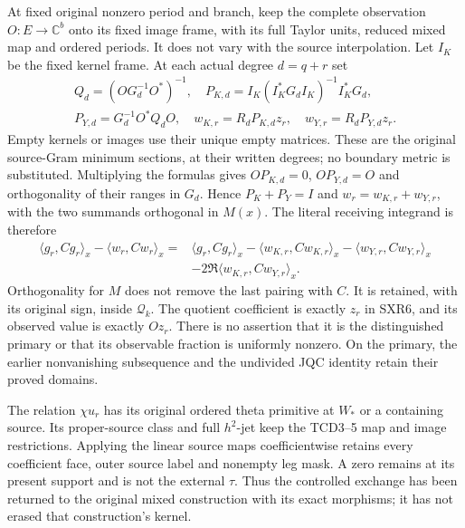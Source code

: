 At fixed original nonzero period and branch, keep the complete
observation $O:E\to\mathbb C^b$ onto its fixed image frame, with
its full Taylor units, reduced mixed map and ordered periods. It
does not vary with the source interpolation. Let $I_K$ be the fixed
kernel frame. At each actual degree $d=q+r$ set
\begin{equation}\tag{SXR19}
\begin{gathered}
 Q_d=(OG_d^{-1}O^*)^{-1},\quad
 P_{K,d}=I_K(I_K^*G_dI_K)^{-1}I_K^*G_d,\\
 P_{Y,d}=G_d^{-1}O^*Q_dO,\quad
 w_{K,r}=R_dP_{K,d}z_r,\quad w_{Y,r}=R_dP_{Y,d}z_r.
\end{gathered}
\end{equation}
Empty kernels or images use their unique empty matrices. These
are the original source-Gram minimum sections, at their written
degrees; no boundary metric is substituted. Multiplying the
formulas gives $OP_{K,d}=0$, $OP_{Y,d}=O$ and orthogonality of
their ranges in $G_d$. Hence $P_K+P_Y=I$ and
$w_r=w_{K,r}+w_{Y,r}$, with the two summands orthogonal in $M(x)$.
The literal receiving integrand is therefore
\begin{equation}\tag{SXR20}
\begin{aligned}
 \langle g_r,Cg_r\rangle_x-\langle w_r,Cw_r\rangle_x
 ={}&\langle g_r,Cg_r\rangle_x
   -\langle w_{K,r},Cw_{K,r}\rangle_x
   -\langle w_{Y,r},Cw_{Y,r}\rangle_x\\
 &-2\Re\langle w_{K,r},Cw_{Y,r}\rangle_x.
\end{aligned}
\end{equation}
Orthogonality for $M$ does not remove the last pairing with $C$.
It is retained, with its original sign, inside $\mathcal Q_k$.
The quotient coefficient is exactly $z_r$ in SXR6, and its observed
value is exactly $Oz_r$. There is no assertion that it is the
distinguished primary or that its observable fraction is uniformly
nonzero. On the primary, the earlier nonvanishing subsequence and
the undivided JQC identity retain their proved domains.

The relation $\chi u_r$ has its original ordered theta primitive
at $W_*$ or a containing source. Its proper-source class and full
$h^2$-jet keep the TCD3--5 map and image restrictions. Applying the
linear source maps coefficientwise retains every coefficient face,
outer source label and nonempty leg mask. A zero remains at its
present support and is not the external $\tau$. Thus the controlled
exchange has been returned to the original mixed construction with
its exact morphisms; it has not erased that construction's kernel.


